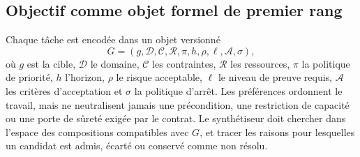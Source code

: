 \subsection{Objectif comme objet formel de premier rang}
Chaque tâche est encodée dans un objet versionné
\[
G=(g,\mathcal{D},\mathcal{C},\mathcal{R},\pi,h,\rho,\ell,\mathcal{A},\sigma),
\]
où \(g\) est la cible, \(\mathcal{D}\) le domaine, \(\mathcal{C}\) les contraintes, \(\mathcal{R}\) les ressources, \(\pi\) la politique de priorité, \(h\) l'horizon, \(\rho\) le risque acceptable, \(\ell\) le niveau de preuve requis, \(\mathcal{A}\) les critères d'acceptation et \(\sigma\) la politique d'arrêt. Les préférences ordonnent le travail, mais ne neutralisent jamais une précondition, une restriction de capacité ou une porte de sûreté exigée par le contrat. Le synthétiseur doit chercher dans l'espace des compositions compatibles avec \(G\), et tracer les raisons pour lesquelles un candidat est admis, écarté ou conservé comme non résolu.
